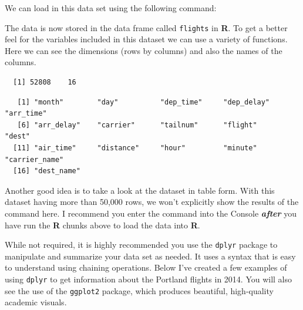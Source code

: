 \documentclass[12pt,msc,a4paper,twoside]{ucl_thesis}
\begin{document}
  We can load in this data set using the following command:
  \begin{Shaded}
  \begin{Highlighting}[]
  \StringTok{ }\NormalTok{(}\NormalTok{)}
  \end{Highlighting}
  \end{Shaded}
  The data is now stored in the data frame called \texttt{flights} in \textbf{R}. To get a better feel for the variables included in this dataset we can use a variety of functions. Here we can see the dimensions (rows by columns) and also the names of the columns.
  \begin{Shaded}
  \begin{Highlighting}[]
  \end{Highlighting}
  \end{Shaded}
  \begin{verbatim}
  [1] 52808    16
  \end{verbatim}
  \begin{Shaded}
  \begin{Highlighting}[]
  \end{Highlighting}
  \end{Shaded}
  \begin{verbatim}
   [1] "month"        "day"          "dep_time"     "dep_delay"    "arr_time"    
   [6] "arr_delay"    "carrier"      "tailnum"      "flight"       "dest"        
  [11] "air_time"     "distance"     "hour"         "minute"       "carrier_name"
  [16] "dest_name"   
  \end{verbatim}
  Another good idea is to take a look at the dataset in table form. With this dataset having more than 50,000 rows, we won't explicitly show the results of the command here. I recommend you enter the command into the Console \textbf{\emph{after}} you have run the \textbf{R} chunks above to load the data into \textbf{R}.
  \begin{Shaded}
  \begin{Highlighting}[]
  \end{Highlighting}
  \end{Shaded}
  While not required, it is highly recommended you use the \texttt{dplyr} package to manipulate and summarize your data set as needed. It uses a syntax that is easy to understand using chaining operations. Below I've created a few examples of using \texttt{dplyr} to get information about the Portland flights in 2014. You will also see the use of the \texttt{ggplot2} package, which produces beautiful, high-quality academic visuals.
  
\end{document}
